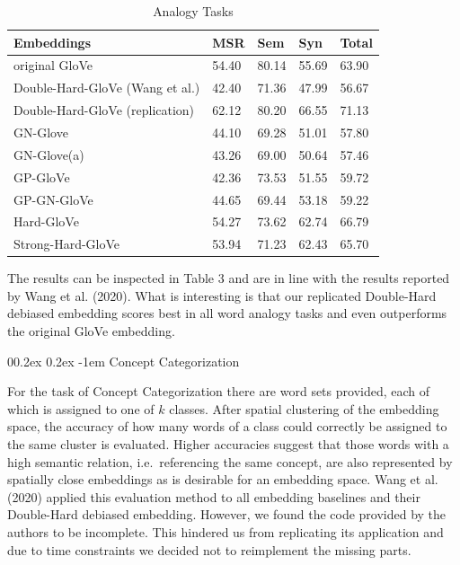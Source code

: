 \documentclass[
  english,
  man,floatsintext]{apa6}
\makeatletter
\let\oldparagraph\paragraph
\renewcommand{\paragraph}[1]{\oldparagraph{#1}\mbox{}}
\renewcommand{\paragraph}{\@startsection{paragraph}{4}{\parindent}%
  {0\baselineskip \@plus 0.2ex \@minus 0.2ex}%
  {-1em}%
  {\normalfont\normalsize\bfseries\itshape\typesectitle}}
\makeatother
\begin{document}
\begin{table}[tbp]

\begin{center}
\begin{threeparttable}

\caption{\label{tab:table 3}Analogy Tasks}

\begin{tabular}{lllll}
\toprule
Embeddings & MSR & Sem & Syn & Total\\
\midrule
original GloVe & 54.40 & 80.14 & 55.69 & 63.90\\
Double-Hard-GloVe (Wang et al.) & 42.40 & 71.36 & 47.99 & 56.67\\
Double-Hard-GloVe (replication) & 62.12 & 80.20 & 66.55 & 71.13\\
GN-Glove & 44.10 & 69.28 & 51.01 & 57.80\\
GN-Glove(a) & 43.26 & 69.00 & 50.64 & 57.46\\
GP-GloVe & 42.36 & 73.53 & 51.55 & 59.72\\
GP-GN-GloVe & 44.65 & 69.44 & 53.18 & 59.22\\
Hard-GloVe & 54.27 & 73.62 & 62.74 & 66.79\\
Strong-Hard-GloVe & 53.94 & 71.23 & 62.43 & 65.70\\
\bottomrule
\end{tabular}

\end{threeparttable}
\end{center}

\end{table}

The results can be inspected in Table 3 and are in line with the results reported by Wang et al. (2020). What is interesting is that our replicated Double-Hard debiased embedding scores best in all word analogy tasks and even outperforms the original GloVe embedding.

\hypertarget{concept-categorization}{%
\paragraph{Concept Categorization}\label{concept-categorization}}

For the task of Concept Categorization there are word sets provided, each of which is assigned to one of \(k\) classes. After spatial clustering of the embedding space, the accuracy of how many words of a class could correctly be assigned to the same cluster is evaluated. Higher accuracies suggest that those words with a high semantic relation, i.e.~referencing the same concept, are also represented by spatially close embeddings as is desirable for an embedding space.
Wang et al. (2020) applied this evaluation method to all embedding baselines and their Double-Hard debiased embedding. However, we found the code provided by the authors to be incomplete. This hindered us from replicating its application and due to time constraints we decided not to reimplement the missing parts.
\end{document}
